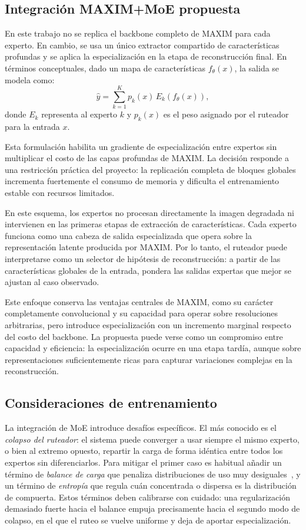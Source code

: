 \documentclass[aps,prl,twocolumn,groupedaddress]{revtex4-2}
\begin{document}
\subsection{Integración MAXIM+MoE propuesta}

En este trabajo no se replica el backbone completo de MAXIM para cada experto. En cambio, se usa un único extractor compartido de características profundas y se aplica la especialización en la etapa de reconstrucción final. En términos conceptuales, dado un mapa de características $f_\theta(x)$, la salida se modela como:
\begin{equation}
\hat{y} = \sum_{k=1}^{K} p_k(x)\, E_k(f_\theta(x)),
\end{equation}
donde $E_k$ representa al experto $k$ y $p_k(x)$ es el peso asignado por el ruteador para la entrada $x$.

Esta formulación habilita un gradiente de especialización entre expertos sin multiplicar el costo de las capas profundas de MAXIM. La decisión responde a una restricción práctica del proyecto: la replicación completa de bloques globales incrementa fuertemente el consumo de memoria y dificulta el entrenamiento estable con recursos limitados.

En este esquema, los expertos no procesan directamente la imagen degradada ni intervienen en las primeras etapas de extracción de características. Cada experto funciona como una cabeza de salida especializada que opera sobre la representación latente producida por MAXIM. Por lo tanto, el ruteador puede interpretarse como un selector de hipótesis de reconstrucción: a partir de las características globales de la entrada, pondera las salidas expertas que mejor se ajustan al caso observado.

Este enfoque conserva las ventajas centrales de MAXIM, como su carácter completamente convolucional y su capacidad para operar sobre resoluciones arbitrarias, pero introduce especialización con un incremento marginal respecto del costo del backbone. La propuesta puede verse como un compromiso entre capacidad y eficiencia: la especialización ocurre en una etapa tardía, aunque sobre representaciones suficientemente ricas para capturar variaciones complejas en la reconstrucción.

\subsection{Consideraciones de entrenamiento}

La integración de MoE introduce desafíos específicos. El más conocido es el \textit{colapso del ruteador}: el sistema puede converger a usar siempre el mismo experto, o bien al extremo opuesto, repartir la carga de forma idéntica entre todos los expertos sin diferenciarlos. Para mitigar el primer caso es habitual añadir un término de \textit{balance de carga} que penaliza distribuciones de uso muy desiguales~\cite{shazeer2017moe,fedus2022switch}, y un término de \textit{entropía} que regula cuán concentrada o dispersa es la distribución de compuerta. Estos términos deben calibrarse con cuidado: una regularización demasiado fuerte hacia el balance empuja precisamente hacia el segundo modo de colapso, en el que el ruteo se vuelve uniforme y deja de aportar especialización.
\end{document}
